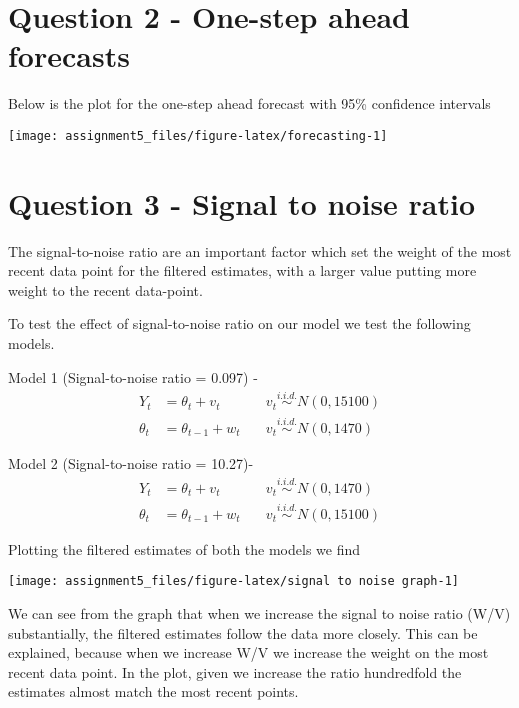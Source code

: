 \documentclass[
]{article}
\begin{document}
\hypertarget{question-2---one-step-ahead-forecasts}{%
\section{Question 2 - One-step ahead
forecasts}\label{question-2---one-step-ahead-forecasts}}

Below is the plot for the one-step ahead forecast with 95\% confidence
intervals

\texttt{[image: assignment5\_files/figure-latex/forecasting-1]}

\hypertarget{question-3---signal-to-noise-ratio}{%
\section{Question 3 - Signal to noise
ratio}\label{question-3---signal-to-noise-ratio}}

The signal-to-noise ratio are an important factor which set the weight
of the most recent data point for the filtered estimates, with a larger
value putting more weight to the recent data-point.

To test the effect of signal-to-noise ratio on our model we test the
following models. \linebreak

Model 1 (Signal-to-noise ratio = 0.097) - \begin{eqnarray*} 
Y_t &= \theta_t + v_t \quad    & v_t \overset{i.i.d.}\sim N(0, 15100)\\
\theta_t &= \theta_{t-1} + w_t \quad   & v_t \overset{i.i.d.}\sim N(0, 1470)
\end{eqnarray*}

Model 2 (Signal-to-noise ratio = 10.27)- \begin{eqnarray*} 
Y_t &= \theta_t + v_t \quad    & v_t \overset{i.i.d.}\sim N(0, 1470)\\
\theta_t &= \theta_{t-1} + w_t \quad   & v_t \overset{i.i.d.}\sim N(0, 15100)
\end{eqnarray*}

Plotting the filtered estimates of both the models we find

\texttt{[image: assignment5\_files/figure-latex/signal to noise graph-1]}

\linebreak

We can see from the graph that when we increase the signal to noise
ratio (W/V) substantially, the filtered estimates follow the data more
closely. This can be explained, because when we increase W/V we increase
the weight on the most recent data point. In the plot, given we increase
the ratio hundredfold the estimates almost match the most recent points.
\end{document}
